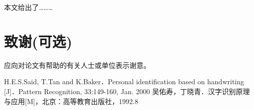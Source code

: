 \documentclass[UTF8]{csoarticle}
\begin{document}
本文给出了………

\section*{致谢(可选)}

应向对论文有帮助的有关人士或单位表示谢意。



\begin{thebibliography}{2} %
     H.E.S.Said, T.Tan and K.Baker．Personal identification based on handwriting [J]．Pattern Recognition, 33:149-160, Jan. 2000
     吴佑寿，丁晓青．汉字识别原理与应用[M]，北京：高等教育出版社，1992.8
\end{thebibliography}
\end{document}
